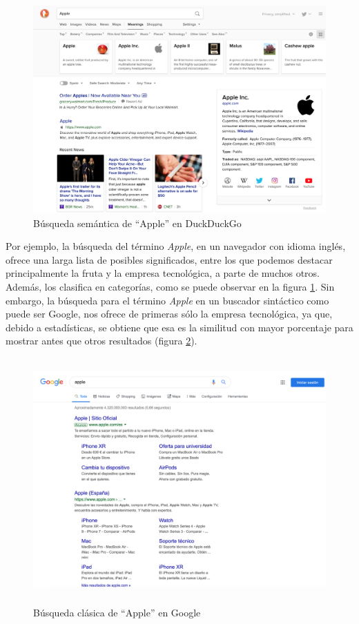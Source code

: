 \begin{figure}[H]
	\centering
	\includegraphics[height=9.cm]{imagenes/capitulo3/duck21}
	\caption{Búsqueda semántica de ``Apple'' en DuckDuckGo}
	\label{busqueda-semantica}
\end{figure}

Por ejemplo, la búsqueda del término \textit{Apple}, en un navegador con idioma inglés, ofrece una larga lista de posibles significados, entre los que podemos destacar principalmente la fruta y la empresa tecnológica, a parte de muchos otros. Además, los clasifica en categorías, como se puede observar en la figura \ref{busqueda-semantica}. Sin embargo, la búsqueda para el término \textit{Apple} en un buscador sintáctico como puede ser Google, nos ofrece de primeras sólo la empresa tecnológica, ya que, debido a estadísticas, se obtiene que esa es la similitud con mayor porcentaje para mostrar antes que otros resultados (figura \ref{busqueda-sintactica}).

\begin{figure}[H]
	\centering
	\includegraphics[height=9.4cm]{imagenes/capitulo3/apple}
	\caption{Búsqueda clásica de ``Apple'' en Google}
	\label{busqueda-sintactica}
\end{figure}

